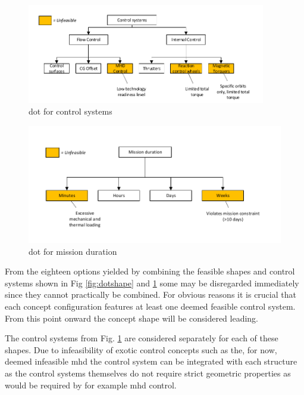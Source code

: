 \begin{figure}[H]
\centering
\includegraphics[width = 0.93\textwidth]{Figure/DOT_control.pdf}
\vspace{-5mm}
\caption{\acrlong{dot} for control systems}
\label{fig:dotcontrol}
\end{figure}

\begin{figure}[H]
\centering
\includegraphics[width = 1.0\textwidth]{Figure/DOT_missionduration.pdf}
\vspace{-5mm}
\caption{\acrlong{dot} for mission duration}
\label{fig:dotduration}
\end{figure}

From the eighteen options yielded by combining the feasible shapes and control systems shown in Fig \ref{fig:dotshape} and \ref{fig:dotcontrol} some may be disregarded immediately since they cannot practically be combined. For obvious reasons it is crucial that each concept configuration features at least one deemed feasible control system. From this point onward the concept shape will be considered leading. 

The control systems from Fig. \ref{fig:dotcontrol} are considered separately for each of these shapes. Due to infeasibility of exotic control concepts such as the, for now, deemed infeasible \gls{mhd} the control system can be integrated with each structure as the control systems themselves do not require strict geometric properties as would be required by for example \gls{mhd} control.

